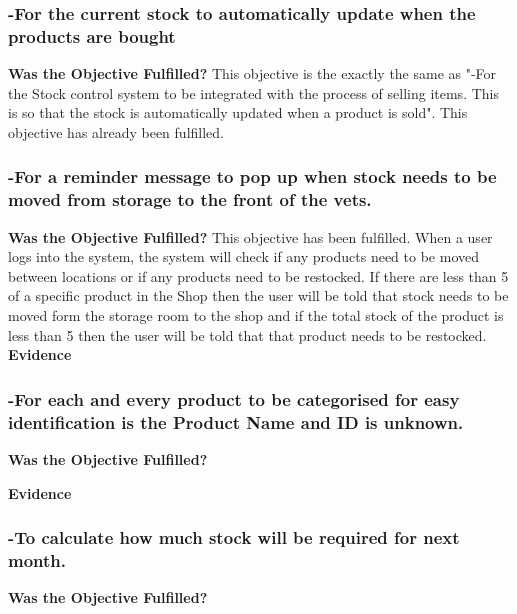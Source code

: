 \subsubsection{-For the current stock to automatically update when the products are bought}
\textbf{Was the Objective Fulfilled?} \newline
This objective is the exactly the same as "-For the Stock control system to be integrated with the process of selling items. This is so that the stock is automatically updated when a product is sold". This objective has already been fulfilled.




\subsubsection{-For a reminder message to pop up when stock needs to be moved from storage to the front of the vets. }
\textbf{Was the Objective Fulfilled?} \newline
This objective has been fulfilled. When a user logs into the system, the system will check if any products need to be moved between locations or if any products need to be restocked. If there are less than 5 of a specific product in the Shop then the user will be told that stock needs to be moved form the storage room to the shop and if the total stock of the product is less than 5 then the user will be told that that product needs to be restocked.
\textbf{Evidence} \newline




\subsubsection{-For each and every product to be categorised for easy identification is the Product Name and ID is unknown.}
\textbf{Was the Objective Fulfilled?} \newline

\textbf{Evidence} \newline





\subsubsection{-To calculate how much stock will be required for next month.}
\textbf{Was the Objective Fulfilled?} \newline

